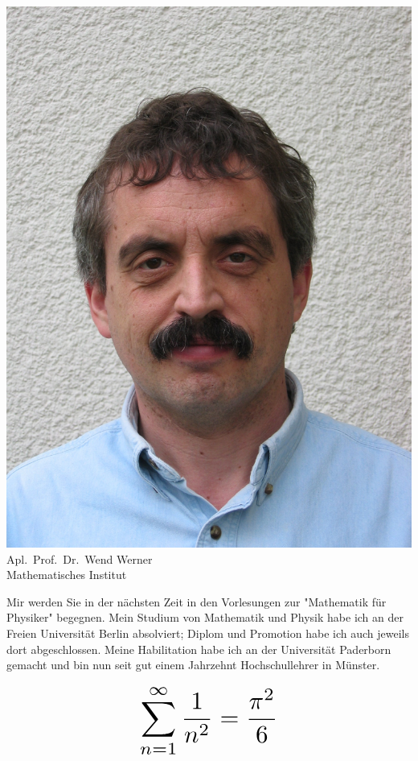 \clearpage

\begin{multicols}{2}
\begin{center}
	\includegraphics[width=\columnwidth, height=0.35\textheight]{res/vorstellungsfotos/wend_werner.jpg}\\
	Apl.\ Prof.\ Dr.\ Wend Werner\\
	Mathematisches Institut
\end{center}

Mir werden Sie in der nächsten Zeit in den Vorlesungen zur "Mathematik für Physiker" begegnen.
Mein Studium von Mathematik und Physik habe ich an der Freien Universität Berlin absolviert; Diplom und Promotion habe ich auch jeweils dort abgeschlossen.
Meine Habilitation habe ich an der Universität Paderborn gemacht und bin nun seit gut einem Jahrzehnt Hochschullehrer in Münster.

\[
	\resizebox{0.4\columnwidth}{!}{
		$\displaystyle\sum_{n = 1}^\infty \frac{1}{n^2} = \frac{\pi^2}{6}$
	}
\]


\end{multicols}
